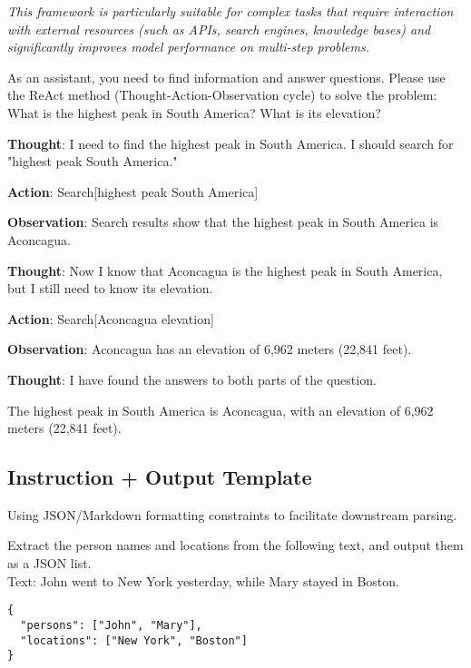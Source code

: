 \documentclass[12pt]{article}
\begin{document}
\textit{This framework is particularly suitable for complex tasks that require interaction with external resources (such as APIs, search engines, knowledge bases) and significantly improves model performance on multi-step problems.}

\begin{promptbox}
As an assistant, you need to find information and answer questions. Please use the ReAct method (Thought-Action-Observation cycle) to solve the problem: What is the highest peak in South America? What is its elevation?
\end{promptbox}

\begin{outputbox}
\textbf{Thought}: I need to find the highest peak in South America. I should search for "highest peak South America."

\textbf{Action}: Search[highest peak South America]

\textbf{Observation}: Search results show that the highest peak in South America is Aconcagua.

\textbf{Thought}: Now I know that Aconcagua is the highest peak in South America, but I still need to know its elevation.

\textbf{Action}: Search[Aconcagua elevation]

\textbf{Observation}: Aconcagua has an elevation of 6,962 meters (22,841 feet).

\textbf{Thought}: I have found the answers to both parts of the question.

The highest peak in South America is Aconcagua, with an elevation of 6,962 meters (22,841 feet).
\end{outputbox}

\subsection{Instruction + Output Template}
Using JSON/Markdown formatting constraints to facilitate downstream parsing.
\begin{promptbox}
Extract the person names and locations from the following text, and output them as a JSON list.\\
Text: John went to New York yesterday, while Mary stayed in Boston.
\end{promptbox}
\begin{outputbox}
\begin{verbatim}
{
  "persons": ["John", "Mary"],
  "locations": ["New York", "Boston"]
}
\end{verbatim}
\end{outputbox}
\end{document}
